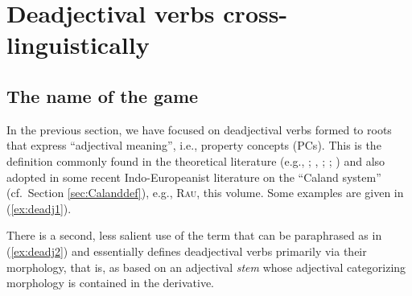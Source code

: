\documentclass[output=paper,colorlinks,citecolor=brown]{langscibook}
\begin{document}
\section{Deadjectival verbs cross-linguistically}
\label{sec:deadj}

\subsection{The name of the game}
\label{sec:def}

In the previous section, we have focused on deadjectival verbs formed to roots that express ``adjectival meaning'', i.e., property concepts (PCs). This is the definition commonly found in the theoretical literature (e.g., \citealt{HaleKeyser2002}; \citealt{KoontzGarboden2005}, \citeyear{KoontzGarboden2014}; \citealt{Bobaljik2012}; \citealt{BeaversKoontz2020}) and also adopted in some recent Indo-Europeanist literature on the ``Caland system''  (cf.\ Section \ref{sec:Calanddef}), e.g., \textsc{Rau}, this volume. Some examples are given in (\ref{ex:deadj1}).



There is a second, less salient use of the term that can be paraphrased as in (\ref{ex:deadj2}) and essentially defines deadjectival verbs primarily via their morphology, that is, as based on an adjectival \emph{stem} whose adjectival categorizing morphology is contained in the derivative. 
\end{document}
